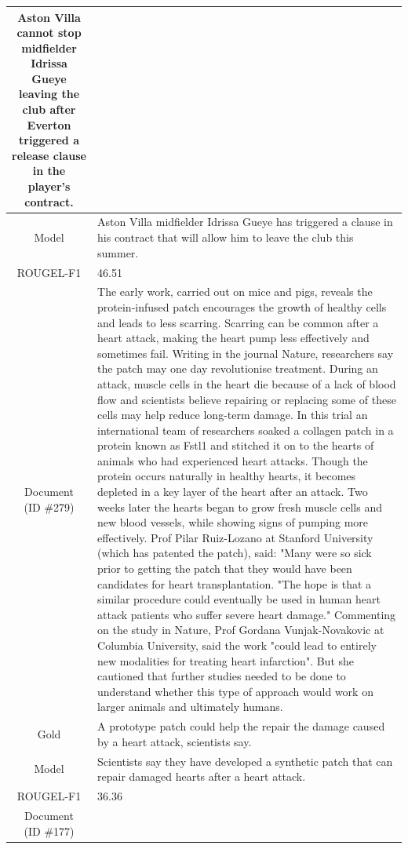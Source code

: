 \begin{table}[bth!]
\begin{tabular}{c|p{}}
Aston Villa cannot stop midfielder Idrissa Gueye leaving the club after Everton triggered a release clause in the player's contract.
\\ \hline
Model & 
Aston Villa midfielder Idrissa Gueye has triggered a clause in his contract that will allow him to leave the club this summer.
\\ \hline
ROUGEL-F1 & 
46.51
\\ \hline
\makecell{Document\\(ID \#279)} & 
The early work, carried out on mice and pigs, reveals the protein-infused patch encourages the growth of healthy cells and leads to less scarring. Scarring can be common after a heart attack, making the heart pump less effectively and sometimes fail. Writing in the journal Nature, researchers say the patch may one day revolutionise treatment. During an attack, muscle cells in the heart die because of a lack of blood flow and scientists believe repairing or replacing some of these cells may help reduce long-term damage. In this trial an international team of researchers soaked a collagen patch in a protein known as Fstl1 and stitched it on to the hearts of animals who had experienced heart attacks. Though the protein occurs naturally in healthy hearts, it becomes depleted in a key layer of the heart after an attack. Two weeks later the hearts began to grow fresh muscle cells and new blood vessels, while showing signs of pumping more effectively. Prof Pilar Ruiz-Lozano at Stanford University (which has patented the patch), said: "Many were so sick prior to getting the patch that they would have been candidates for heart transplantation. "The hope is that a similar procedure could eventually be used in human heart attack patients who suffer severe heart damage." Commenting on the study in Nature, Prof Gordana Vunjak-Novakovic at Columbia University, said the work "could lead to entirely new modalities for treating heart infarction". But she cautioned that further studies needed to be done to understand whether this type of approach would work on larger animals and ultimately humans.
\\ \hline
Gold & 
A prototype patch could help the repair the damage caused by a heart attack, scientists say.
\\ \hline
Model & 
Scientists say they have developed a synthetic patch that can repair damaged hearts after a heart attack.
\\ \hline
ROUGEL-F1 & 
36.36
\\ \hline
\makecell{Document\\(ID \#177)} & 

\end{tabular}
\end{table}
